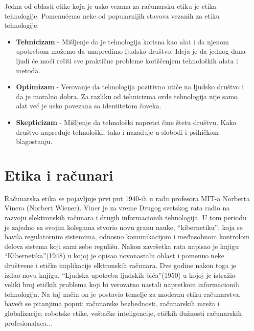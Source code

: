 \documentclass[a4paper]{article}
\begin{document}
Jedna od oblasti etike koja je usko vezana za računarsku etiku je etika tehnologije. Pomenućemo neke od popularnijih stavova vezanih za etiku tehnologije:
\begin{itemize}
	\item \textbf{Tehnicizam} -
	Mišljenje da je tehnologija korisna kao alat i da njenom upotrebom možemo da unapredimo ljudsko društvo. Ideja je da jednog dana ljudi će moći rešiti sve praktične probleme koriščenjem tehnoloških alata i metoda.
	\item \textbf{Optimizam} - Verovanje da tehnologija pozitivno utiče na ljudsko društvo i da je moralno dobra. Za razliku od tehnicizma ovde tehnologija nije samo alat već je usko povezana sa identitetom čoveka.
	\item \textbf{Skepticizam} - Mišljenje da tehnološki napretci čine štetu društvu.
	Kako društvo napreduje tehnološki, tako i nazaduje u slobodi i psihičkom blagostanju.
\end{itemize}


\section{Etika i računari}


Računarska etika se pojavljuje prvi put 1940-ih u radu profesora MIT-a %
Norberta Vinera (Norbert Wiener). Viner je za vreme Drugog svetskog rata radio na razvoju elektronskih računara i drugih informacionih tehnologija. U tom periodu je zajedno sa svojim kolegama stvorio novu granu nauke, ``kibernetiku'', koja se bavila regulatornim sistemima, odnosno komunikacijom i međusobnom kontrolom delova sistema koji sami sebe regulišu.
Nakon završetka rata napisao je knjigu ``Kibernetika''(1948) u kojoj je opisao novonastalu oblast i pomenuo neke društvene i etičke implikacije elktronskih računara. Dve godine nakon toga je izdao novu knjigu, ``Ljudska upotreba ljudskih bića''(1950) u kojoj je istražio veliki broj etičkih problema koji bi verovatno nastali napretkom informacionih tehnologija. Na taj način on je postavio temelje za modernu etiku računarstva, baveći se pitanjima poput: računarske bezbednosti, računarskih mreža i globalizacije, robotske etike, veštačke inteligencije, etičkih dužnosti računarskih profesionalaca...
\end{document}
